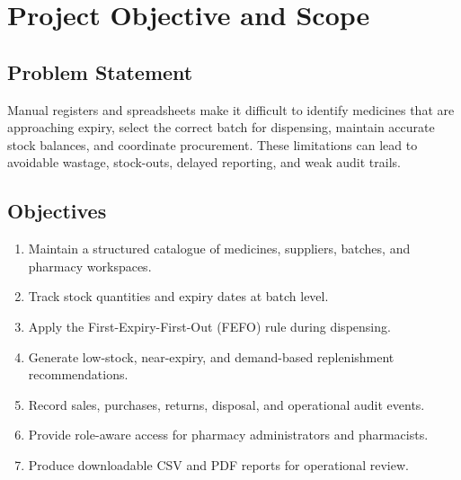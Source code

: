 \documentclass[12pt,a4paper]{article}
\begin{document}
\section{Project Objective and Scope}
\subsection{Problem Statement}
Manual registers and spreadsheets make it difficult to identify medicines that
are approaching expiry, select the correct batch for dispensing, maintain
accurate stock balances, and coordinate procurement. These limitations can lead
to avoidable wastage, stock-outs, delayed reporting, and weak audit trails.

\subsection{Objectives}
\begin{enumerate}[leftmargin=*]
    \item Maintain a structured catalogue of medicines, suppliers, batches, and
    pharmacy workspaces.
    \item Track stock quantities and expiry dates at batch level.
    \item Apply the First-Expiry-First-Out (FEFO) rule during dispensing.
    \item Generate low-stock, near-expiry, and demand-based replenishment
    recommendations.
    \item Record sales, purchases, returns, disposal, and operational audit
    events.
    \item Provide role-aware access for pharmacy administrators and pharmacists.
    \item Produce downloadable CSV and PDF reports for operational review.
\end{enumerate}
\end{document}
